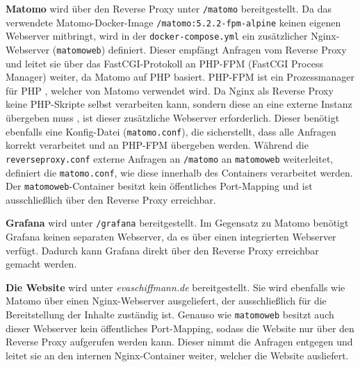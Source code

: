 \textbf{Matomo} wird über den Reverse Proxy unter \texttt{/matomo} bereitgestellt. Da das verwendete Matomo-Docker-Image \texttt{/matomo:5.2.2-fpm-alpine} keinen eigenen Webserver mitbringt, wird in der \texttt{docker-compose.yml} ein zusätzlicher Nginx-Webserver (\texttt{matomo\textunderscore web}) definiert. Dieser empfängt Anfragen vom Reverse Proxy und leitet sie über das FastCGI-Protokoll an PHP-FPM (FastCGI Process Manager) weiter, da Matomo auf PHP basiert. PHP-FPM ist ein Prozessmanager für PHP \parencite{PHPFPM}, welcher von Matomo verwendet wird. Da Nginx als Reverse Proxy keine PHP-Skripte selbst verarbeiten kann, sondern diese an eine externe Instanz übergeben muss \parencite{NginxReverseProxy}, ist dieser zusätzliche Webserver erforderlich. Dieser benötigt ebenfalls eine Konfig-Datei (\texttt{matomo.conf}), die sicherstellt, dass alle Anfragen korrekt verarbeitet und an PHP-FPM übergeben werden. Während die \texttt{reverse\textunderscore proxy.conf} externe Anfragen an \texttt{/matomo} an \texttt{matomo\textunderscore web} weiterleitet, definiert die \texttt{matomo.conf}, wie diese innerhalb des Containers verarbeitet werden. Der \texttt{matomo\textunderscore web}-Container besitzt kein öffentliches Port-Mapping und ist ausschließlich über den Reverse Proxy erreichbar.

\textbf{Grafana} wird unter \texttt{/grafana} bereitgestellt. Im Gegensatz zu Matomo benötigt Grafana keinen separaten Webserver, da es über einen integrierten Webserver verfügt. Dadurch kann Grafana direkt über den Reverse Proxy erreichbar gemacht werden.

\textbf{Die Website} wird unter \textit{evaschiffmann.de} bereitgestellt. Sie wird ebenfalls wie Matomo über einen Nginx-Webserver ausgeliefert, der ausschließlich für die Bereitstellung der Inhalte zuständig ist. Genauso wie \texttt{matomo\textunderscore web} besitzt auch dieser Webserver kein öffentliches Port-Mapping, sodass die Website nur über den Reverse Proxy aufgerufen werden kann. Dieser nimmt die Anfragen entgegen und leitet sie an den internen Nginx-Container weiter, welcher die Website ausliefert.

\begin{figure}[H]
    \centering
    \begin{minipage}{\textwidth}
        
    \end{minipage}
\end{figure}


